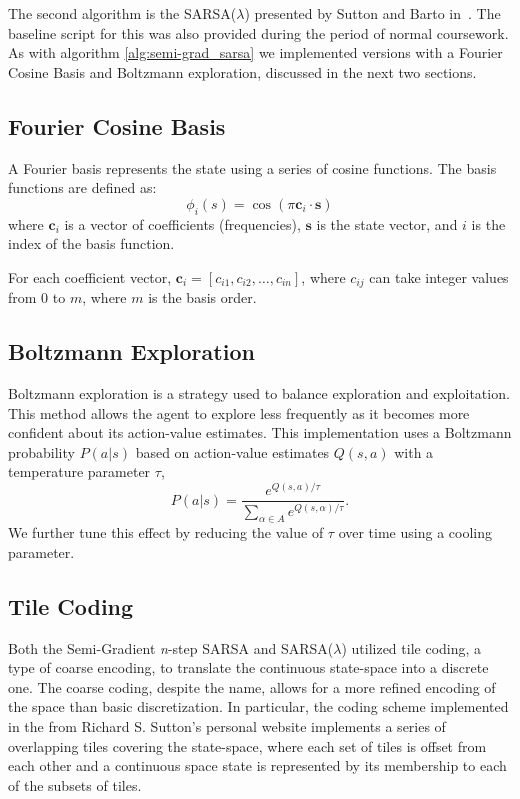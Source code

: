 \documentclass[journal]{IEEEtran}
\begin{document}
The second algorithm is the SARSA(\(\lambda\)) presented by Sutton and Barto in~\cite{sutton2018}.
The baseline script for this was also provided during the period of normal coursework.
As with algorithm \ref{alg:semi-grad_sarsa} we implemented versions with a Fourier Cosine Basis
and Boltzmann exploration, discussed in the next two sections.

\subsection{Fourier Cosine Basis}
A Fourier basis represents the state using a series of cosine functions. 
The basis functions are defined as:
\[ \phi_i(s)=\cos(\pi\mathbf{c}_i\cdot\mathbf{s}) \]
where \(\mathbf{c}_i\) is a vector of coefficients (frequencies), 
\(\mathbf{s}\) is the state vector, and \(i\) is the index of the basis function.

For each coefficient vector, \(\mathbf{c}_i = [c_{i1},c_{i2},\ldots,c_{in}]\), where 
\(c_{ij}\) can take integer values from \(0\) to \(m\), where \(m\) is the basis order.

\subsection{Boltzmann Exploration}
Boltzmann exploration is a strategy used to balance exploration and exploitation. 
This method allows the agent to explore less frequently as it becomes more confident about its 
action-value estimates. This implementation uses a Boltzmann probability \(P(a|s)\) based
on action-value estimates \(Q(s,a)\) with a temperature parameter \(\tau\),
\[ P(a|s) = \frac{e^{Q(s,a)/\tau}}{\sum_{\alpha\in A} e^{Q(s,\alpha)/\tau}} .\]
We further tune this effect by reducing the value of \(\tau\) over time using a cooling parameter.

\subsection{Tile Coding}
Both the Semi-Gradient \emph{n}-step SARSA and SARSA($\lambda$) utilized tile coding,
a type of coarse encoding, to translate the continuous state-space into a discrete one.
The coarse coding, despite the name, allows for a more refined encoding of the space
than basic discretization. In particular, the coding scheme implemented in the
 from Richard S. Sutton's personal website
implements a series of overlapping tiles covering the state-space, where each set of tiles
is offset from each other and a continuous space state is represented by its membership to each
of the subsets of tiles.
\end{document}
